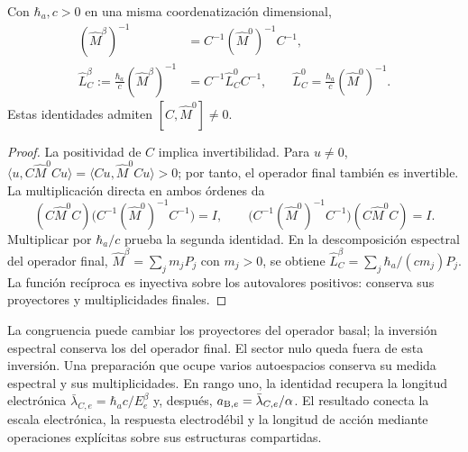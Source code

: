 \begin{proposition}
Con $\hbar_a,c>0$ en una misma coordenatización dimensional,
\begin{equation}
 \begin{aligned}
 (\widehat M^\beta)^{-1}
    &=C^{-1}(\widehat M^0)^{-1}C^{-1},\\
 \widehat L_C^\beta:=\frac{\hbar_a}{c}(\widehat M^\beta)^{-1}
    &=C^{-1}\widehat L_C^0C^{-1},\qquad
 \widehat L_C^0=\frac{\hbar_a}{c}(\widehat M^0)^{-1}.
 \end{aligned}
 \label{amp-ew-inversa-operador}
\end{equation}
Estas identidades admiten $[C,\widehat M^0]\ne0$.
\end{proposition}
\begin{proof}
La positividad de $C$ implica invertibilidad. Para $u\ne0$,
$\langle u,C\widehat M^0Cu\rangle
=\langle Cu,\widehat M^0Cu\rangle>0$; por tanto, el operador final
también es invertible. La multiplicación directa en ambos órdenes da
\[
 (C\widehat M^0C)\bigl(C^{-1}(\widehat M^0)^{-1}C^{-1}\bigr)=I,
 \qquad
 \bigl(C^{-1}(\widehat M^0)^{-1}C^{-1}\bigr)(C\widehat M^0C)=I.
\]
Multiplicar por $\hbar_a/c$ prueba la segunda identidad. En la
descomposición espectral del operador final,
$\widehat M^\beta=\sum_jm_jP_j$ con $m_j>0$, se obtiene
$\widehat L_C^\beta=\sum_j\hbar_a/(cm_j)P_j$. La función recíproca
es inyectiva sobre los autovalores positivos: conserva sus proyectores
y multiplicidades finales.
\end{proof}

La congruencia puede cambiar los proyectores del operador basal; la
inversión espectral conserva los del operador final. El sector nulo
queda fuera de esta inversión. Una preparación que ocupe varios
autoespacios conserva su medida espectral y sus multiplicidades.
En rango uno, la identidad recupera la longitud electrónica
$\bar\lambda_{C,e}=\hbar_ac/E_e^\beta$ y, después,
$a_{{\rm B},e}=\bar\lambda_{C,e}/\alpha$. El resultado conecta la
escala electrónica, la respuesta electrodébil y la longitud de acción
mediante operaciones explícitas sobre sus estructuras compartidas.
